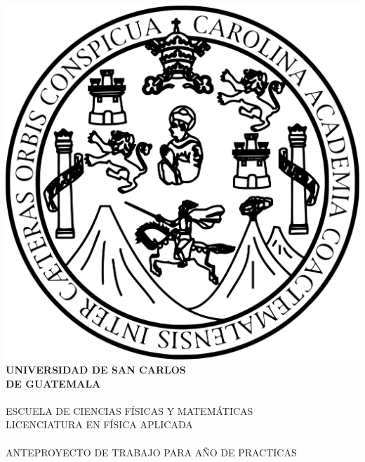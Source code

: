 \documentclass[12pt,spanish,letterpage, twoside, openright]{article}
\date{}
\begin{document}

\begin{titlepage}
\setlength{\parindent}{0mm} %
	\begin{center}
		\includegraphics[scale=0.2]{img/LOGO-USAC-BNOFICIAL.pdf}\\
		{\huge \textbf{UNIVERSIDAD DE SAN CARLOS \vspace{5mm} \\ DE GUATEMALA}}\\
		~\\
		{\Large ESCUELA DE CIENCIAS FÍSICAS Y MATEMÁTICAS}\\
		{ \large LICENCIATURA EN FÍSICA APLICADA }\\
		~\\
		{\large ANTEPROYECTO DE TRABAJO PARA AÑO DE PRACTICAS}~\\
	\end{center}
	

\end{titlepage}
\end{document}

